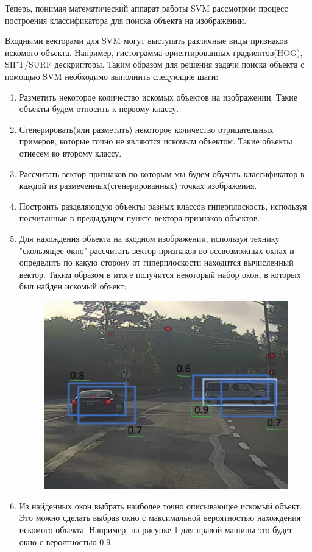 Теперь, понимая математический аппарат работы SVM рассмотрим процесс построения классификатора для поиска объекта на изображении.

Входными векторами для SVM могут выступать различные виды признаков искомого объекта. Например, гистограмма ориентированных градиентов(HOG)\cite{b:HOG}, SIFT\cite{b:SIFT}/SURF\cite{b:SURF} дескрипторы.
Таким образом для решения задачи поиска объекта с помощью SVM необходимо выполнить следующие шаги:
\begin{enumerate}
	\item Разметить некоторое количество искомых объектов на изображении. Такие объекты будем относить к первому классу.
	\item Сгенерировать(или разметить) некоторое количество отрицательных примеров, которые точно не являются искомым объектом. Такие объекты отнесем ко второму классу.
	\item Рассчитать вектор признаков по которым мы будем обучать классификатор в каждой из размеченных(сгенерированных) точках изображения.
	\item Построить разделяющую объекты разных классов гиперплоскость, используя посчитанные в предыдущем пункте вектора признаков объектов.
	\item Для нахождения объекта на входном изображении, используя технику "скользящее окно"\cite{b:window} рассчитать вектор признаков во всевозможных окнах и определить по какую сторону от гиперплоскости находится вычисленный вектор. 
	Таким образом в итоге получится некоторый набор окон, в которых был найден искомый объект:
	\begin{figure}[h!]
		\centering
		\includegraphics[width=0.7\linewidth]{pictures/screenshot024}
		\caption{}
		\label{fig:screenshot024}
	\end{figure}
	\item Из найденных окон выбрать наиболее точно описывающее искомый объект. Это можно сделать выбрав окно с максимальной вероятностью нахождения искомого объекта. Например, на рисунке \ref{fig:screenshot024} для правой машины это будет окно с вероятностью 0,9.
\end{enumerate}

